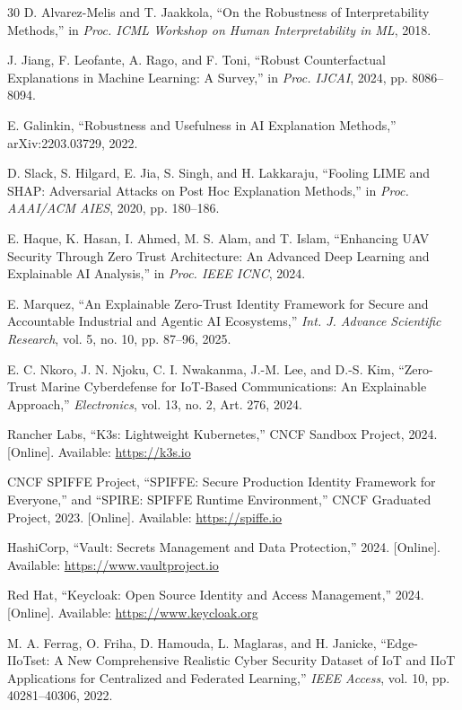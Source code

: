 \documentclass[conference]{IEEEtran}
\begin{document}
\begin{thebibliography}{30}
D. Alvarez-Melis and T. Jaakkola, ``On the Robustness of Interpretability Methods,'' in \textit{Proc. ICML Workshop on Human Interpretability in ML}, 2018.

J. Jiang, F. Leofante, A. Rago, and F. Toni, ``Robust Counterfactual Explanations in Machine Learning: A Survey,'' in \textit{Proc. IJCAI}, 2024, pp. 8086--8094.

E. Galinkin, ``Robustness and Usefulness in AI Explanation Methods,'' arXiv:2203.03729, 2022.

D. Slack, S. Hilgard, E. Jia, S. Singh, and H. Lakkaraju, ``Fooling LIME and SHAP: Adversarial Attacks on Post Hoc Explanation Methods,'' in \textit{Proc. AAAI/ACM AIES}, 2020, pp. 180--186.

E. Haque, K. Hasan, I. Ahmed, M. S. Alam, and T. Islam, ``Enhancing UAV Security Through Zero Trust Architecture: An Advanced Deep Learning and Explainable AI Analysis,'' in \textit{Proc. IEEE ICNC}, 2024.

E. Marquez, ``An Explainable Zero-Trust Identity Framework for Secure and Accountable Industrial and Agentic AI Ecosystems,'' \textit{Int. J. Advance Scientific Research}, vol. 5, no. 10, pp. 87--96, 2025.

E. C. Nkoro, J. N. Njoku, C. I. Nwakanma, J.-M. Lee, and D.-S. Kim, ``Zero-Trust Marine Cyberdefense for IoT-Based Communications: An Explainable Approach,'' \textit{Electronics}, vol. 13, no. 2, Art. 276, 2024.

Rancher Labs, ``K3s: Lightweight Kubernetes,'' CNCF Sandbox Project, 2024. [Online]. Available: \url{https://k3s.io}

CNCF SPIFFE Project, ``SPIFFE: Secure Production Identity Framework for Everyone,'' and ``SPIRE: SPIFFE Runtime Environment,'' CNCF Graduated Project, 2023. [Online]. Available: \url{https://spiffe.io}

HashiCorp, ``Vault: Secrets Management and Data Protection,'' 2024. [Online]. Available: \url{https://www.vaultproject.io}

Red Hat, ``Keycloak: Open Source Identity and Access Management,'' 2024. [Online]. Available: \url{https://www.keycloak.org}

M. A. Ferrag, O. Friha, D. Hamouda, L. Maglaras, and H. Janicke, ``Edge-IIoTset: A New Comprehensive Realistic Cyber Security Dataset of IoT and IIoT Applications for Centralized and Federated Learning,'' \textit{IEEE Access}, vol. 10, pp. 40281--40306, 2022.


\end{thebibliography}
\end{document}

